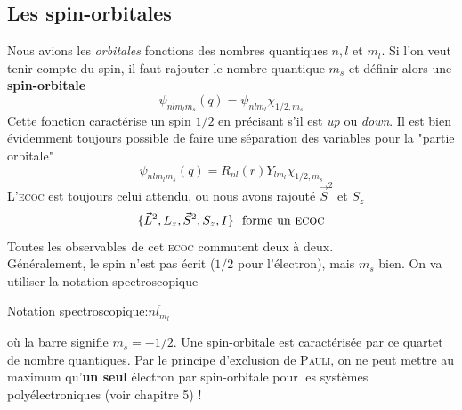 \subsection{Les spin-orbitales}
Nous avions les \textit{orbitales} fonctions des nombres quantiques $n,l$ et $m_l$. Si l'on veut tenir compte
du spin, il faut rajouter le nombre quantique $m_s$ et définir alors une \textbf{spin-orbitale}
\begin{equation}
\psi_{nlm_lm_s}(q) =  \psi_{nlm_l}\chi_{1/2,m_s}
\end{equation}
Cette fonction caractérise un spin $1/2$ en précisant s'il est \textit{up} ou \textit{down}. Il est bien 
évidemment toujours possible de faire une séparation des variables pour la "partie orbitale"
\begin{equation}
\psi_{nlm_lm_s}(q) =  R_{nl}(r)Y_{lm_l}\chi_{1/2,m_s}
\end{equation}
L'\textsc{ecoc} est toujours celui attendu, ou nous avons rajouté $\vec{S}^2$ et $S_z$
\begin{equation}
\{\vec{L}^2, L_z, \vec{S}^2, S_z, I\}\ \text{ forme un \textsc{ecoc}}
\end{equation}
Toutes les observables de cet \textsc{ecoc} commutent deux à deux. \\

Généralement, le spin n'est pas écrit ($1/2$ pour l'électron), mais $m_s$ bien. On va utiliser la notation 
spectroscopique 
\begin{center}
Notation spectroscopique\quad :\quad $\overline{nl_{m_l}}$
\end{center}
où la barre signifie $m_s=-1/2$. Une spin-orbitale est caractérisée par ce quartet de nombre quantiques. Par
le principe d'exclusion de \textsc{Pauli}, on ne peut mettre au maximum qu'\textbf{un seul} électron par 
spin-orbitale pour les systèmes polyélectroniques (voir chapitre 5) !



\newpage
